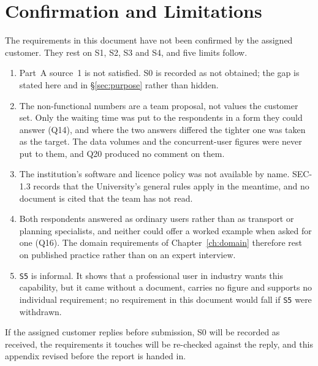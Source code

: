 \documentclass[12pt,a4paper]{report}
\begin{document}
\section{Confirmation and Limitations}
\label{sec:limitations}

The requirements in this document have not been confirmed by the assigned
customer. They rest on S1, S2, S3 and S4, and five limits follow.

\begin{enumerate}
  \item Part~A source~1 is not satisfied. S0 is recorded as not obtained;
    the gap is stated here and in \S\ref{sec:purpose} rather than hidden.
  \item The non-functional numbers are a team proposal, not values the
    customer set. Only the waiting time was put to the respondents in a form
    they could answer (Q14), and where the two answers differed the tighter
    one was taken as the target. The data volumes and the concurrent-user
    figures were never put to them, and Q20 produced no comment on them.
  \item The institution's software and licence policy was not available by
    name. SEC-1.3 records that the University's general rules apply in the
    meantime, and no document is cited that the team has not read.
  \item Both respondents answered as ordinary users rather than as transport
    or planning specialists, and neither could offer a worked example when
    asked for one (Q16). The domain requirements of Chapter~\ref{ch:domain}
    therefore rest on published practice rather than on an expert interview.
  \item \texttt{S5} is informal. It shows that a professional user in
    industry wants this capability, but it came without a document, carries
    no figure and supports no individual requirement; no requirement in this
    document would fall if \texttt{S5} were withdrawn.
\end{enumerate}

If the assigned customer replies before submission, S0 will be recorded as
received, the requirements it touches will be re-checked against the reply,
and this appendix revised before the report is handed in.
\end{document}
